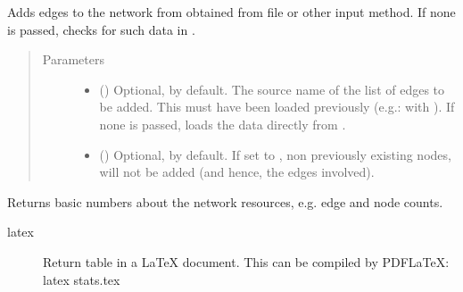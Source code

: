\documentclass[letterpaper,10pt,english]{sphinxmanual}
\begin{document}
\begin{fulllineitems}

\begin{fulllineitems}
\label{\detokenize{main:pypath.main.PyPath.attach_network}}
Adds edges to the network from  obtained from file or
other input method. If none is passed, checks for such data in
.
\begin{quote}\begin{description}
\item[{Parameters}] \leavevmode\begin{itemize}
\item {} 
 () \textendash{} Optional,  by default. The source name of the list
of edges to be added. This must have been loaded previously
(e.g.: with {\hyperref[\detokenize{main:pypath.main.PyPath.read_data_file}]{}}).
If none is passed, loads the data directly from
.

\item {} 
 () \textendash{} Optional,  by default. If set to , non
previously existing nodes, will not be added (and hence, the
edges involved).

\end{itemize}

\end{description}\end{quote}

\end{fulllineitems}


\begin{fulllineitems}
\label{\detokenize{main:pypath.main.PyPath.basic_stats}}
Returns basic numbers about the network resources, e.g. edge and
node counts.
\begin{description}
\item[{latex}] \leavevmode
Return table in a LaTeX document. This can be compiled by
PDFLaTeX:
latex stats.tex


\end{description}
\end{fulllineitems}
\end{fulllineitems}
\end{document}
